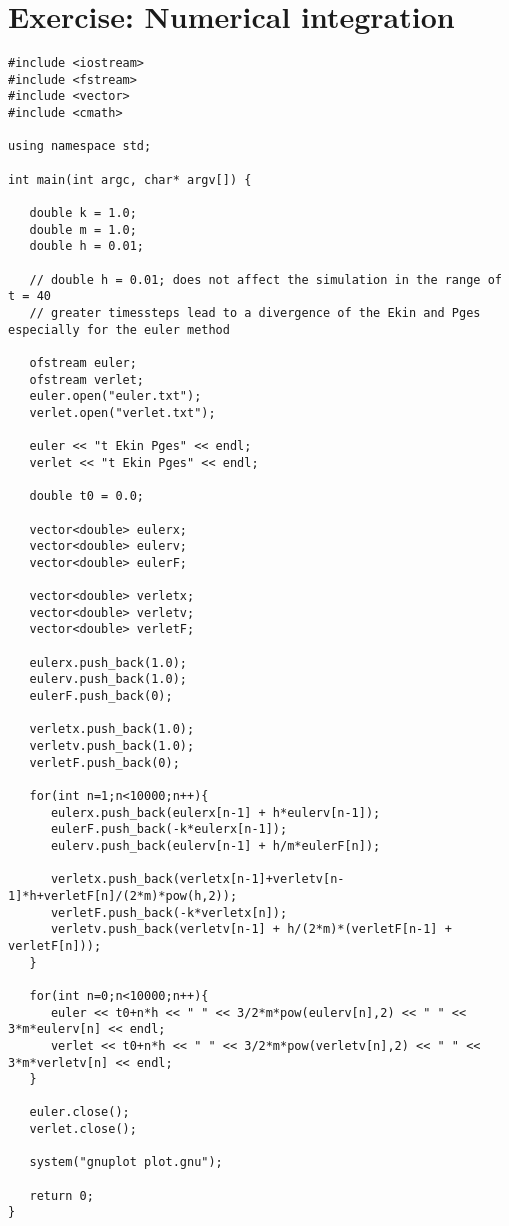 \documentclass[11pt]{article}
\begin{document}
\date{\today}

\section{Exercise: Numerical integration}
\begin{lstlisting}
#include <iostream>
#include <fstream>
#include <vector>
#include <cmath>

using namespace std;

int main(int argc, char* argv[]) {

   double k = 1.0;
   double m = 1.0;
   double h = 0.01;

   // double h = 0.01; does not affect the simulation in the range of t = 40
   // greater timessteps lead to a divergence of the Ekin and Pges especially for the euler method

   ofstream euler;
   ofstream verlet;
   euler.open("euler.txt");
   verlet.open("verlet.txt");

   euler << "t Ekin Pges" << endl;
   verlet << "t Ekin Pges" << endl;

   double t0 = 0.0;

   vector<double> eulerx;
   vector<double> eulerv;
   vector<double> eulerF;

   vector<double> verletx;
   vector<double> verletv;
   vector<double> verletF;

   eulerx.push_back(1.0);
   eulerv.push_back(1.0);
   eulerF.push_back(0);

   verletx.push_back(1.0);
   verletv.push_back(1.0);
   verletF.push_back(0);

   for(int n=1;n<10000;n++){
      eulerx.push_back(eulerx[n-1] + h*eulerv[n-1]);
      eulerF.push_back(-k*eulerx[n-1]);
      eulerv.push_back(eulerv[n-1] + h/m*eulerF[n]);

      verletx.push_back(verletx[n-1]+verletv[n-1]*h+verletF[n]/(2*m)*pow(h,2));
      verletF.push_back(-k*verletx[n]);
      verletv.push_back(verletv[n-1] + h/(2*m)*(verletF[n-1] + verletF[n]));
   }

   for(int n=0;n<10000;n++){
      euler << t0+n*h << " " << 3/2*m*pow(eulerv[n],2) << " " << 3*m*eulerv[n] << endl;
      verlet << t0+n*h << " " << 3/2*m*pow(verletv[n],2) << " " << 3*m*verletv[n] << endl;
   }

   euler.close();
   verlet.close();

   system("gnuplot plot.gnu");

   return 0;
}

\end{lstlisting}
\end{document}
